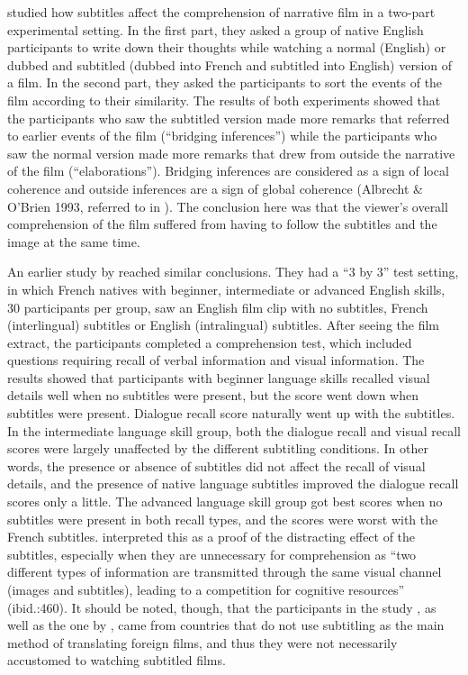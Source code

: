 \documentclass[output=paper]{langsci/langscibook}
\begin{document}
\citet{lee2013} studied how subtitles affect the comprehension of narrative film in a two-part experimental setting. In the first part, they asked a group of native English participants to write down their thoughts while watching a normal (English) or dubbed and subtitled (dubbed into French and subtitled into English) version of a film. In the second part, they asked the participants to sort the events of the film according to their similarity. The results of both experiments showed that the participants who saw the subtitled version made more remarks that referred to earlier events of the film (“bridging inferences”) while the participants who saw the normal version made more remarks that drew from outside the narrative of the film (“elaborations”). Bridging inferences are considered as a sign of local coherence and outside inferences are a sign of global coherence (Albrecht \& O’Brien 1993, referred to in \citet{lee2013}). The conclusion here was that the viewer’s overall comprehension of the film suffered from having to follow the subtitles and the image at the same time.

An earlier study by \citet{lavaur2011} reached similar conclusions. They had a “3 by 3” test setting, in which French natives with beginner, intermediate or advanced English skills, 30 participants per group, saw an English film clip with no subtitles, French (interlingual) subtitles or English (intralingual) subtitles. After seeing the film extract, the participants completed a comprehension test, which included questions requiring recall of verbal information and visual information. The results showed that participants with beginner language skills recalled visual details well when no subtitles were present, but the score went down when subtitles were present. Dialogue recall score naturally went up with the subtitles. In the intermediate language skill group, both the dialogue recall and visual recall scores were largely unaffected by the different subtitling conditions. In other words, the presence or absence of subtitles did not affect the recall of visual details, and the presence of native language subtitles improved the dialogue recall scores only a little. The advanced language skill group got best scores when no subtitles were present in both recall types, and the scores were worst with the French subtitles. \citet{lavaur2011} interpreted this as a proof of the distracting effect of the subtitles, especially when they are unnecessary for comprehension as “two different types of information are transmitted through the same visual channel (images and subtitles), leading to a competition for cognitive resources” (ibid.:460). It should be noted, though, that the participants in the study \citet{lavaur2011}, as well as the one by \citet{lee2013}, came from countries that do not use subtitling as the main method of translating foreign films, and thus they were not necessarily accustomed to watching subtitled films. 
\end{document}
